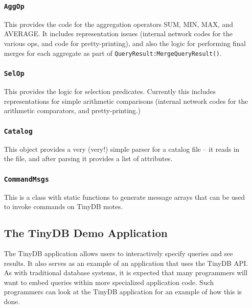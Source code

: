 \documentclass[11pt]{article}
\begin{document}
\subsubsection{\tt AggOp} 
\label{sec:tinydbaggop}
This provides the code for the aggregation
  operators SUM, MIN, MAX, and AVERAGE.  It includes representation
  issues (internal network codes for the various ops, and code for
  pretty-printing), and also the logic for performing final merges for
  each aggregate as part of {\tt QueryResult:MergeQueryResult()}.

\subsubsection{\tt SelOp}  
\label{sec:tinydbselop}
This provides the logic for selection predicates.
  Currently this includes representations for simple arithmetic
  comparisons (internal network codes for the arithmetic comparators,
  and pretty-printing.)

\subsubsection{\tt Catalog}  
\label{sec:tinydbcatalog}
This object provides a very (very!) simple parser
  for a catalog file -- it reads in the file, and after parsing it
  provides a list of attributes.

\subsubsection{\tt CommandMsgs} This is a class with static functions to
    generate message arrays that can be used to invoke commands on TinyDB
    motes.

\subsection{The TinyDB Demo Application}
\label{sec:app}
The TinyDB application allows users to interactively specify queries
and see results.  It also serves as an example of an application that
uses the TinyDB API.  As with traditional database systems, it is
expected that many programmers will want to embed queries within more
specialized application code.  Such programmers can look at the TinyDB
application for an example of how this is done.
\end{document}
